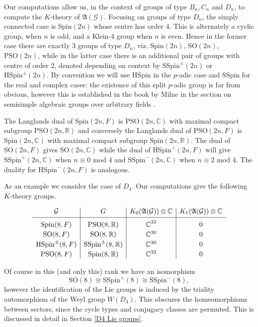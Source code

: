 \documentclass[11pt,a4paper]{article}
\def\SSpin{\mathrm{SSpin}}
\def\HSpin{\mathrm{HSpin}}
\def\Spin{\mathrm{Spin}}
\def\SO{\mathrm{SO}}
\def\PSO{\mathrm{PSO}}
\def\SSpin{\mathrm{SSpin}}
\def\fA{\mathfrak{A}}
\def\R{\mathbb{R}}
\def\fA{\mathfrak{A}}
\newcommand{\C}{\mathbb{C}}
\def\G{\mathcal{G}}
\begin{document}
\bigskip


Our computations allow us, in the context of groups of type $B_n,C_n$ and $D_n$, to compute the $K$-theory of $\fA(\G)$.
Focusing on groups of type $D_n$, the simply connected case is $\Spin(2n)$ whose centre has order $4$.  This is alternately a cyclic group, when $n$ is odd, and a Klein-$4$ group when $n$ is even.  Hence in the former case there are exactly $3$ groups of type $D_n$, viz. $\Spin(2n)$, $\SO(2n)$, $\PSO(2n)$, while in the latter case there is an additional pair of groups with centre of order $2$, denoted depending on context by $\SSpin^{\pm}(2n)$ or $\HSpin^{\pm}(2n)$. By convention we will use $\HSpin$ in the $p$-adic case and $\SSpin$ for the real and complex cases: the existence of this split $p$-adic group is far from obvious, however this is established in the book by Milne in the section on semisimple algebraic groups over arbitrary fields \cite[\S23]{Mil}.



The Langlands dual of $\Spin(2n,F)$ is $\PSO(2n,\C)$ with maximal compact subgroup $\PSO(2n,\R)$ and conversely the Langlands dual of $\PSO(2n,F)$ is $\Spin(2n,\C)$ with maximal compact subgroup $\Spin(2n,\R)$. The dual of $\SO(2n,F)$ gives $\SO(2n,\C)$ while the dual of $\HSpin^{+}(2n,F)$ will give $\SSpin^{+}(2n,\C)$ when $n\equiv 0$ mod $4$ and $\SSpin^{-}(2n,\C)$ when $n\equiv 2$ mod $4$. The duality for $\HSpin^{-}(2n,F)$ is analogous.


As an example we consider the case of $D_4$. 
Our computations give the following $K$-theory groups. 
\bigskip

\begin{table}[h]
\[
\begin{array}{c|c|c|c}
  \G&{G}&K_0(\fA(\G))\otimes \C &K_1(\fA(\G))\otimes \C\\[.5ex]
\hline
\Spin(8,F)   &\PSO(8,\R)   & \C^{33\strut } &0\\[.5ex]
 \SO(8,F)   & \SO(8,\R)   & \C^{30}&0\\[.5ex]
\HSpin^\pm(8,F)   &\SSpin^\pm(8,\R)   & \C^{30}&0\\[.5ex]
\PSO(8,F)   &\Spin(8,\R)   & \C^{33}&0\\
\end{array}
\]
\bigskip

    \caption{The $K$-theory of the reduced Iwahori-spherical algebra $\fA(\G)$ for $p$-adic groups of type $D_4$.}
\end{table}


Of course in this (and only this) rank we have an isomorphism
\[
\SO(8)\cong\SSpin^+(8)\cong\SSpin^-(8),
\]
however the identification of the Lie groups is induced by the triality automorphism of the Weyl group $W(D_4)$.  This obscures the homeomorphisms between sectors, since the cycle types and conjugacy classes are permuted. This is discussed in detail in Section \ref{D4 Lie groups}.
\end{document}
